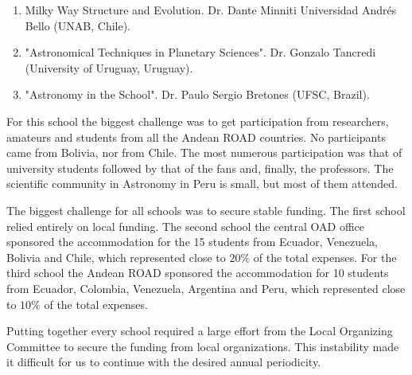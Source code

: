 \begin{enumerate}
    \item  Milky Way Structure and Evolution. Dr. Dante Minniti Universidad Andrés Bello (UNAB, Chile).
    \item "Astronomical Techniques in Planetary Sciences". Dr. Gonzalo Tancredi (University of Uruguay, Uruguay).
    \item "Astronomy in the School". Dr. Paulo Sergio Bretones (UFSC, Brazil).
\end{enumerate}

For this school the biggest challenge was to get participation from
researchers, amateurs and students from all the Andean ROAD
countries. No participants came from Bolivia, nor from Chile.  
The most numerous participation was that of university students
followed by that of the fans and, finally, the professors. 
The scientific community in Astronomy in Peru is small, but most of
them attended.   



The biggest challenge for all schools was to secure stable funding.
 The first school relied entirely on local funding.
The second school the central OAD office sponsored the
accommodation for the 15 students from Ecuador, Venezuela, 
Bolivia and Chile, which represented close to $20\%$ of the total expenses.
For the third school the Andean ROAD sponsored the accommodation for
10 students from  Ecuador, Colombia, Venezuela, Argentina and Peru,
which represented close to $10\%$ of the total expenses. 

Putting together every school required a large effort from the Local
Organizing Committee to secure the funding from local organizations.
This instability made it difficult for us to continue with the desired
annual periodicity. 

